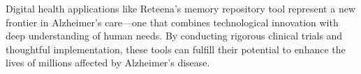Digital health applications like Reteena's memory repository tool represent a new frontier in Alzheimer's care—one that combines technological innovation with deep understanding of human needs. By conducting rigorous clinical trials and thoughtful implementation, these tools can fulfill their potential to enhance the lives of millions affected by Alzheimer's disease.